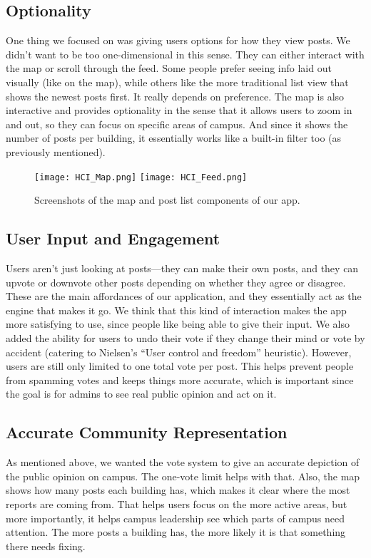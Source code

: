 \documentclass{article}
\begin{document}
\subsection{Optionality}

One thing we focused on was giving users options for how they view posts. We didn't want to be too one-dimensional in this sense. They can either interact with the map or scroll through the feed. Some people prefer seeing info laid out visually (like on the map), while others like the more traditional list view that shows the newest posts first. It really depends on preference. The map is also interactive and provides optionality in the sense that it allows users to zoom in and out, so they can focus on specific areas of campus. And since it shows the number of posts per building, it essentially works like a built-in filter too (as previously mentioned).

\begin{figure}[htbp]
    \centering
    \texttt{[image: HCI\_Map.png]}
    \texttt{[image: HCI\_Feed.png]}
    \caption{Screenshots of the map and post list components of our app.}
    \label{fig:mapnfeed}
\end{figure}

\subsection{User Input and Engagement}

Users aren’t just looking at posts—they can make their own posts, and they can upvote or downvote other posts depending on whether they agree or disagree. These are the main affordances of our application, and they essentially act as the engine that makes it go. We think that this kind of interaction makes the app more satisfying to use, since people like being able to give their input.
We also added the ability for users to undo their vote if they change their mind or vote by accident (catering to Nielsen’s “User control and freedom” heuristic). However, users are still only limited to one total vote per post. This helps prevent people from spamming votes and keeps things more accurate, which is important since the goal is for admins to see real public opinion and act on it.

\subsection{Accurate Community Representation}

As mentioned above, we wanted the vote system to give an accurate depiction of the public opinion on campus. The one-vote limit helps with that. Also, the map shows how many posts each building has, which makes it clear where the most reports are coming from. That helps users focus on the more active areas, but more importantly, it helps campus leadership see which parts of campus need attention. The more posts a building has, the more likely it is that something there needs fixing.
\end{document}
